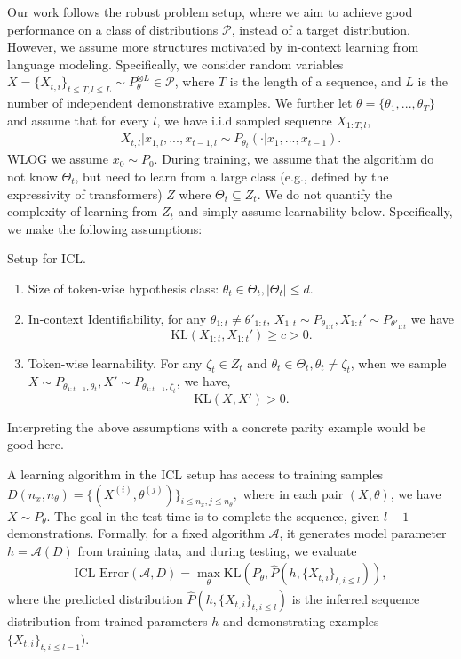 Our work follows the robust problem setup, where we aim to achieve good performance on a class of distributions $\mathcal{P}$, instead of a target distribution. However, we assume more structures motivated by in-context learning from language modeling. 
Specifically, we consider random variables $X  = \{X_{t, i}\}_{t \le T, l \le L} \sim P_{\theta}^{\otimes L} \in \mathcal{P}$, where $T$ is the length of a sequence, and $L$ is the number of independent demonstrative examples.
We further let $\theta = \{\theta_1, ..., \theta_T\} $ and assume that for every $l$, we have i.i.d sampled sequence $X_{1:T, l}$,
\begin{align*}
    X_{t, l} | x_{1, l}, ..., x_{t-1, l} \sim P_{\theta_t}(\cdot | x_1, ..., x_{t-1}).
\end{align*}
WLOG we assume $x_0 \sim P_0$. During training, we assume that the algorithm do not know $\Theta_t$, but need to learn from a large class (e.g., defined by the expressivity of transformers) $Z$ where $\Theta_t \subseteq Z_t$. We do not quantify the complexity of learning from $Z_t$ and simply assume learnability below. Specifically, we make the following assumptions:
\begin{assumption}
Setup for ICL.
\begin{enumerate}
    \item Size of token-wise hypothesis class: $\theta_t \in \Theta_t, |\Theta_t| \le d$. 
    \item In-context Identifiability, for any $\theta_{1:t} \neq \theta'_{1:t}$, $X_{1:t} \sim P_{\theta_{1:t}}, X_{1:t}' \sim P_{\theta'_{1:t}}$ we have
    \[
    \text{KL}(X_{1:t}, X_{1:t}') \ge c > 0.
    \] %
    \item Token-wise learnability. 
    For any $\zeta_t \in Z_t$ and $\theta_{t} \in \Theta_t, \theta_{t} \neq \zeta_t$, when we sample $X \sim P_{\theta_{1:t-1}, \theta_t}, X' \sim P_{\theta_{1:t-1}, \zeta_t}$, we have,
    \[
    \text{KL}(X, X') > 0.
    \]
\end{enumerate}    
\end{assumption}


Interpreting the above assumptions with a concrete parity example would be good here.  


A learning algorithm in the ICL setup has access to training samples $D(n_x, n_\theta) = \{(X^{(i)}, \theta^{(j)})\}_{i \le n_{x}, j \le n_{\theta}},$ where in each pair $(X, \theta)$, we have $X \sim P_{\theta}$. The goal in the test time is to complete the sequence, given $l-1$ demonstrations. Formally, for a fixed algorithm $\mathcal{A}$, it generates model parameter $h = \mathcal{A}(D)$ from training data, and during testing, we evaluate 
\begin{align*}
    \text{ICL Error}(\mathcal{A}, D) = \max_\theta \text{KL}(P_{\theta}, \hat{P}(h, \{X_{t,i}\}_{t, i\le l})),
\end{align*}
where the predicted distribution $\hat{P}(h, \{X_{t,i}\}_{t, i\le l})$ is the inferred sequence distribution from trained parameters $h$ and demonstrating examples $\{X_{t,i}\}_{t, i\le l-1})$.

